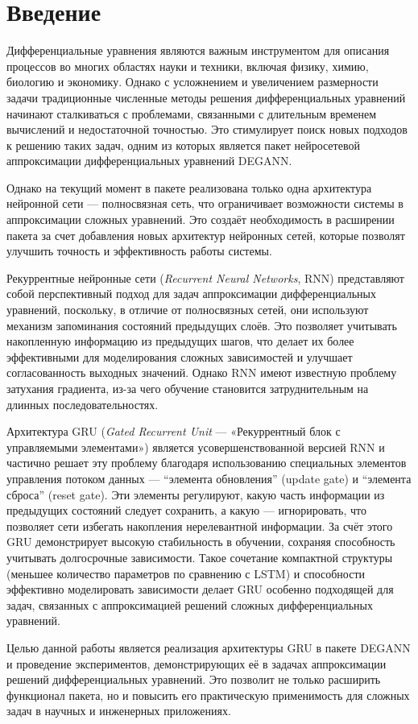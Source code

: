 
\section*{Введение}
\thispagestyle{withCompileDate}

Дифференциальные уравнения являются важным инструментом для описания процессов во многих областях науки и техники, включая физику, химию, биологию и экономику. Однако с усложнением и увеличением размерности задачи традиционные численные методы решения дифференциальных уравнений начинают сталкиваться с проблемами, связанными с длительным временем вычислений и недостаточной точностью. Это стимулирует поиск новых подходов к решению таких задач, одним из которых является пакет нейросетевой аппроксимации дифференциальных уравнений DEGANN\cite{degann}.

Однако на текущий момент в пакете реализована только одна архитектура нейронной сети — полносвязная сеть, что ограничивает возможности системы в аппроксимации сложных уравнений. Это создаёт необходимость в расширении пакета за счет добавления новых архитектур нейронных сетей, которые позволят улучшить точность и эффективность работы системы.

Рекуррентные нейронные сети (\textit{Recurrent Neural Networks}, RNN\cite{IBM_RNN}) представляют собой перспективный подход для задач аппроксимации дифференциальных уравнений, поскольку, в отличие от полносвязных сетей, они используют механизм запоминания состояний предыдущих слоёв. Это позволяет учитывать накопленную информацию из предыдущих шагов, что делает их более эффективными для моделирования сложных зависимостей и улучшает согласованность выходных значений. Однако RNN имеют известную проблему затухания градиента, из-за чего обучение становится затруднительным на длинных последовательностях.

Архитектура GRU (\textit{Gated Recurrent Unit} --- «Рекуррентный блок с управляемыми элементами»\cite{gru}) является усовершенствованной версией RNN и частично решает эту проблему благодаря использованию специальных элементов управления потоком данных — “элемента обновления” (update gate) и “элемента сброса” (reset gate). Эти элементы регулируют, какую часть информации из предыдущих состояний следует сохранить, а какую — игнорировать, что позволяет сети избегать накопления нерелевантной информации. За счёт этого GRU демонстрирует высокую стабильность в обучении, сохраняя способность учитывать долгосрочные зависимости. Такое сочетание компактной структуры (меньшее количество параметров по сравнению с LSTM\cite{lstm}) и способности эффективно моделировать зависимости делает GRU особенно подходящей для задач, связанных с аппроксимацией решений сложных дифференциальных уравнений.

Целью данной работы является реализация архитектуры GRU в пакете DEGANN\cite{degann} и проведение экспериментов, демонстрирующих её в задачах аппроксимации решений дифференциальных уравнений. Это позволит не только расширить функционал пакета, но и повысить его практическую применимость для сложных задач в научных и инженерных приложениях.
